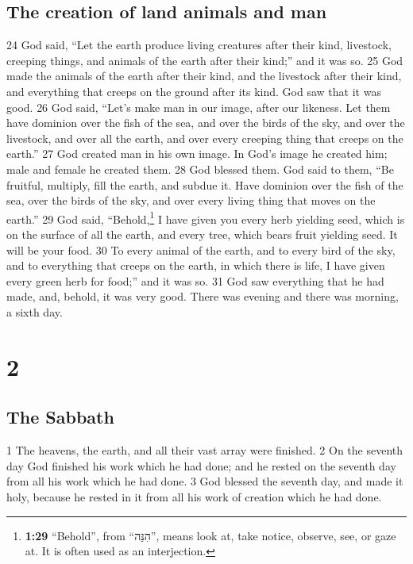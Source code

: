 \hypertarget{the-creation-of-land-animals-and-man}{%
\subsection{The creation of land animals and
man}\label{the-creation-of-land-animals-and-man}}

{24} God said, ``Let the earth produce living creatures after their
kind, livestock, creeping things, and animals of the earth after their
kind;'' and it was so. {25} God made the animals of the earth after
their kind, and the livestock after their kind, and everything that
creeps on the ground after its kind. God saw that it was good. {26} God
said, ``Let's make man in our image, after our likeness. Let them have
dominion over the fish of the sea, and over the birds of the sky, and
over the livestock, and over all the earth, and over every creeping
thing that creeps on the earth.'' {27} God created man in his own image.
In God's image he created him; male and female he created them. {28} God
blessed them. God said to them, ``Be fruitful, multiply, fill the earth,
and subdue it. Have dominion over the fish of the sea, over the birds of
the sky, and over every living thing that moves on the earth.'' {29} God
said, ``Behold,\footnote{\textbf{1:29} ``Behold'', from ``{הִנֵּה}'',
  means look at, take notice, observe, see, or gaze at. It is often used
  as an interjection.} I have given you every herb yielding seed, which
is on the surface of all the earth, and every tree, which bears fruit
yielding seed. It will be your food. {30} To every animal of the earth,
and to every bird of the sky, and to everything that creeps on the
earth, in which there is life, I have given every green herb for food;''
and it was so. {31} God saw everything that he had made, and, behold, it
was very good. There was evening and there was morning, a sixth day.

\hypertarget{section-1}{%
\section{2}\label{section-1}}

\hypertarget{the-sabbath}{%
\subsection{The Sabbath}\label{the-sabbath}}

{1} The heavens, the earth, and all their vast array were finished. {2}
On the seventh day God finished his work which he had done; and he
rested on the seventh day from all his work which he had done. {3} God
blessed the seventh day, and made it holy, because he rested in it from
all his work of creation which he had done.


